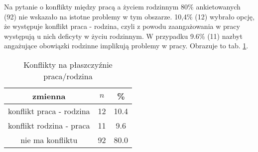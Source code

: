 Na pytanie o konflikty między pracą a życiem rodzinnym 80\% ankietowanych (92) nie wskazało na istotne problemy w tym obszarze. 10,4\% (12) wybrało opcję, że występuje konflikt praca - rodzina, czyli z powodu zaangażowania w pracy występują u nich deficyty w życiu rodzinnym. W przypadku 9.6\% (11) nazbyt angażujące obowiązki rodzinne implikują problemy w pracy. Obrazuje to tab. \ref{tab:Q27}.

\begin{table}[H]
\caption{Konflikty na płaszczyźnie praca/rodzina}
\centering
\begin{tabular}{ | c | c | c |}
\hline
zmienna & $n$ & \% \\
\hline
konflikt praca - rodzina  &  12  & 10.4\\
\hline
konflikt rodzina - praca  &  11  & 9.6 \\
\hline
nie ma konfliktu  &  92  & 80.0\\
\hline
\end{tabular}
\label{tab:Q27}
\end{table}
